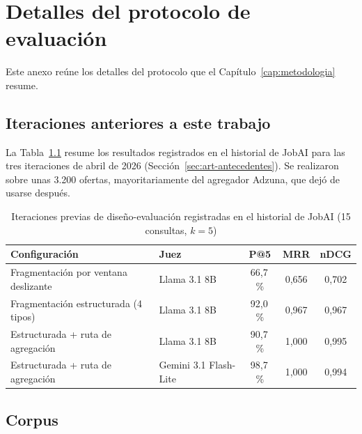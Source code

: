 
\chapter{Detalles del protocolo de evaluación}
\label{anx:protocolo}

Este anexo reúne los detalles del protocolo que el Capítulo~\ref{cap:metodologia} resume.

\section{Iteraciones anteriores a este trabajo}

La Tabla~\ref{tab:met-iteraciones} resume los resultados registrados en el historial de JobAI para las tres iteraciones de abril de 2026 (Sección~\ref{sec:art-antecedentes}). Se realizaron sobre unas 3.200 ofertas, mayoritariamente del agregador Adzuna, que dejó de usarse después.

\begin{table}[htbp!]
    \centering
    \caption{Iteraciones previas de diseño-evaluación registradas en el historial de JobAI (15 consultas, $k=5$)}
    \label{tab:met-iteraciones}
    \begin{tabular}{|p{6.2cm}|p{2.6cm}|c|c|c|}
        \hline
        \textbf{Configuración} & \textbf{Juez} & \textbf{P@5} & \textbf{MRR} & \textbf{nDCG} \\
        \hline
        Fragmentación por ventana deslizante & Llama 3.1 8B & 66,7\,\% & 0,656 & 0,702 \\
        \hline
        Fragmentación estructurada (4 tipos) & Llama 3.1 8B & 92,0\,\% & 0,967 & 0,967 \\
        \hline
        Estructurada + ruta de agregación & Llama 3.1 8B & 90,7\,\% & 1,000 & 0,995 \\
        \hline
        Estructurada + ruta de agregación & Gemini 3.1 Flash-Lite & 98,7\,\% & 1,000 & 0,994 \\
        \hline
    \end{tabular}
\end{table}

\section{Corpus}
\label{anx:corpus}

